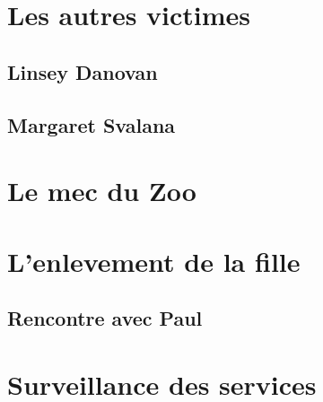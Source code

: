 \documentclass[10pt,a5paper,oneside]{book}
\begin{document}
\section{ Les autres victimes}

\subsection{ Linsey Danovan}


\subsection{Margaret Svalana}


\section{ Le mec du Zoo}

\section{L'enlevement de la fille}

\subsection{ Rencontre avec Paul}

\section{Surveillance des services}
\end{document}
